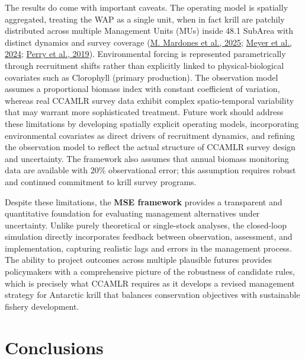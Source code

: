 \documentclass[
]{article}
\begin{document}
The results do come with important caveats. The operating model is spatially aggregated, treating the WAP as a single unit, when in fact krill are patchily distributed across multiple Management Units (MUs) inside 48.1 SubArea with distinct dynamics and survey coverage (\protect\hyperlink{ref-Mardones2025}{M. Mardones et al., 2025}; \protect\hyperlink{ref-WGEMM2439}{Meyer et al., 2024}; \protect\hyperlink{ref-Perry2019}{Perry et al., 2019}). Environmental forcing is represented parametrically through recruitment shifts rather than explicitly linked to physical-biological covariates such as Clorophyll (primary production). The observation model assumes a proportional biomass index with constant coefficient of variation, whereas real CCAMLR survey data exhibit complex spatio-temporal variability that may warrant more sophisticated treatment. Future work should address these limitations by developing spatially explicit operating models, incorporating environmental covariates as direct drivers of recruitment dynamics, and refining the observation model to reflect the actual structure of CCAMLR survey design and uncertainty. The framework also assumes that annual biomass monitoring data are available with 20\% observational error; this assumption requires robust and continued commitment to krill survey programs.

Despite these limitations, the \textbf{MSE framework} provides a transparent and quantitative foundation for evaluating management alternatives under uncertainty. Unlike purely theoretical or single-stock analyses, the closed-loop simulation directly incorporates feedback between observation, assessment, and implementation, capturing realistic lags and errors in the management process. The ability to project outcomes across multiple plausible futures provides policymakers with a comprehensive picture of the robustness of candidate rules, which is precisely what CCAMLR requires as it develops a revised management strategy for Antarctic krill that balances conservation objectives with sustainable fishery development.

\pagebreak

\hypertarget{conclusions}{%
\section{Conclusions}\label{conclusions}}
\end{document}
